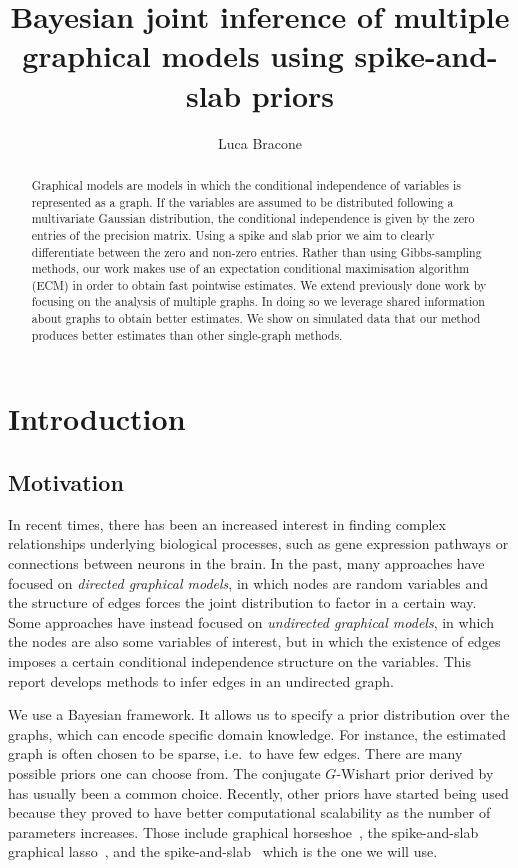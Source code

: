 \documentclass[a4paper, 11pt, oneside]{report}
\author{Luca Bracone}
\title{Bayesian joint inference of multiple graphical models using
spike-and-slab priors}
\newcommand{\1}{\mathds{1}}
\begin{document}
\maketitle

\begin{abstract}
	Graphical models are models in which the conditional independence of
	variables is represented as a graph. If the variables are assumed to be
	distributed following a multivariate Gaussian distribution, the conditional
	independence is given by the zero entries of the precision matrix. Using a
	spike and slab prior we aim to clearly differentiate between the zero and
	non-zero entries. Rather than using Gibbs-sampling methods, our work makes
	use of an expectation conditional maximisation algorithm (ECM) in order to
	obtain fast pointwise estimates. We extend previously done work by focusing
	on the analysis of multiple graphs. In doing so we leverage shared
	information about graphs to obtain better estimates. We show on simulated
	data that our method produces better estimates than other single-graph
	methods.
\end{abstract}

\chapter{Introduction}
\section{Motivation}
In recent times, there has been an increased interest in finding complex
relationships underlying biological processes, such as gene expression pathways
or connections between neurons in the brain. In the past, many approaches have
focused on \emph{directed graphical models}, in which nodes are random
variables and the structure of edges forces the joint distribution to factor in
a certain way. Some approaches have instead focused on \emph{undirected
	graphical models}, in which the nodes are also some variables of interest, but
in which the existence of edges imposes a certain conditional independence
structure on the variables. This report develops methods to infer edges in an
undirected graph.

We use a Bayesian framework. It allows us to specify a prior distribution over the
graphs, which can encode specific domain knowledge. For instance, the estimated
graph is often chosen to be sparse, i.e.\ to have few edges.
There are many possible priors one can choose from.
The conjugate $G$-Wishart prior derived by~\cite{HyperInverseWRovera2002}
has usually been a common choice.
Recently, other priors have started being used because they proved to have
better computational scalability as the number of parameters increases.
Those include graphical horseshoe~\parencite{cami2022}, the spike-and-slab
graphical lasso~\parencite{limm2018}, and the
spike-and-slab~\parencite{wang-2015} which is the one we will use.
\end{document}
